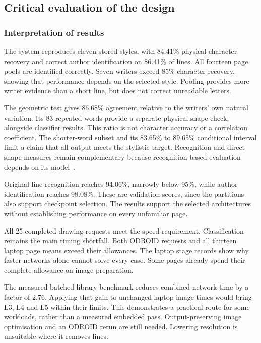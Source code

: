 \label{sec:discussion}
\subsection{Critical evaluation of the design}
\label{sec:dis-critical}
\subsubsection{Interpretation of results}
\label{sec:dis-interpretation}
The system reproduces eleven stored styles, with 84.41\% physical character recovery and correct author identification on 86.41\% of lines. All fourteen page pools are identified correctly. Seven writers exceed 85\% character recovery, showing that performance depends on the selected style. Pooling provides more writer evidence than a short line, but does not correct unreadable letters.

The geometric test gives 86.68\% agreement relative to the writers' own natural variation. Its 83 repeated words provide a separate physical-shape check, alongside classifier results. This ratio is not character accuracy or a correlation coefficient. The shorter-word subset and its 83.65\% to 89.65\% conditional interval limit a claim that all output meets the stylistic target. Recognition and direct shape measures remain complementary because recognition-based evaluation depends on its model~\cite[p.~2]{chen2022glyph}.

Original-line recognition reaches 94.06\%, narrowly below 95\%, while author identification reaches 98.08\%. These are validation scores, since the partitions also support checkpoint selection. The results support the selected architectures without establishing performance on every unfamiliar page.

All 25 completed drawing requests meet the speed requirement. Classification remains the main timing shortfall. Both ODROID requests and all thirteen laptop page means exceed their allowances. The laptop stage records show why faster networks alone cannot solve every case. Some pages already spend their complete allowance on image preparation.

The measured batched-library benchmark reduces combined network time by a factor of 2.76. Applying that gain to unchanged laptop image times would bring L3, L4 and L5 within their limits. This demonstrates a practical route for some workloads, rather than a measured embedded pass. Output-preserving image optimisation and an ODROID rerun are still needed. Lowering resolution is unsuitable where it removes lines.

